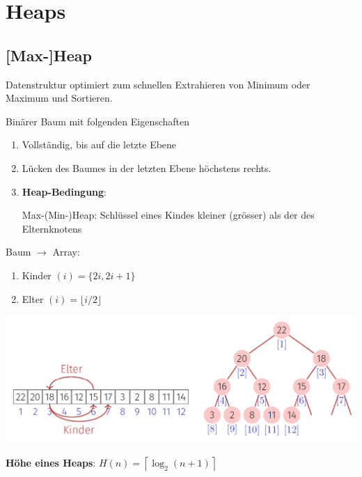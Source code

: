 \section{Heaps}
\vspace{-4pt}
\begin{sectionbox}
\subsection{[Max-]Heap}\smallskip
Datenstruktur optimiert zum schnellen Extrahieren von Minimum oder Maximum und Sortieren.\par\smallskip

Binärer Baum mit folgenden Eigenschaften\par
\begin{enumerate}
    \item Vollständig, bis auf die letzte Ebene
    \item Lücken des Baumes in der letzten Ebene höchstens rechts.
    \item \textbf{Heap-Bedingung}:
    \par Max-(Min-)Heap: Schlüssel eines Kindes kleiner (grösser) als der des Elternknotens
\end{enumerate}\smallskip

Baum $\rightarrow$ Array:
\begin{enumerate}
    \item Kinder $(i)=\{2 i, 2 i+1\}$
    \item Elter $(i)=\lfloor i / 2\rfloor$
\end{enumerate}\smallskip

\includegraphics[width = \columnwidth]{../img/heaps.png}\smallskip

\textbf{Höhe eines Heaps}: $H(n)=\left\lceil\log _{2}(n+1)\right\rceil$\par\smallskip

\end{sectionbox}
